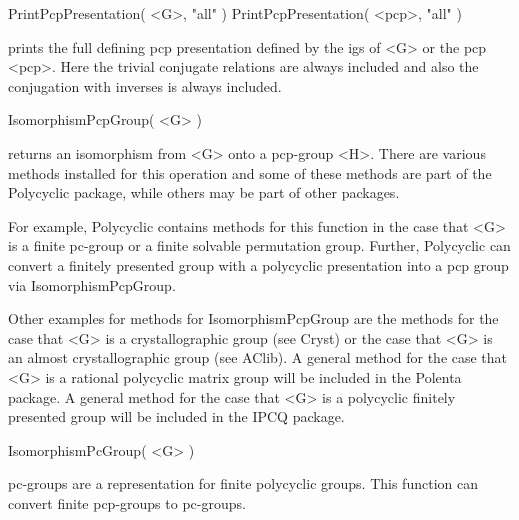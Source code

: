 \> PrintPcpPresentation( <G>, "all" )
\> PrintPcpPresentation( <pcp>, "all" )

prints the full defining pcp presentation defined by the igs of <G> or the 
pcp <pcp>. Here the trivial conjugate relations are always included and also
the conjugation with inverses is always included.


\>IsomorphismPcpGroup( <G> )

returns an isomorphism from <G> onto a pcp-group <H>. There are various
methods installed for this operation and some of these methods are part
of the Polycyclic package, while others may be part of other packages. 

For example, Polycyclic contains methods for this function in the case
that <G> is a finite pc-group or a finite solvable permutation group. 
Further, Polycyclic can convert a finitely presented group with a 
polycyclic presentation into a pcp group via IsomorphismPcpGroup.

Other examples for methods for IsomorphismPcpGroup are the methods for
the case that <G> is a crystallographic group (see Cryst) or the case
that <G> is an almost crystallographic group (see AClib). A general 
method for the case that <G> is a rational polycyclic matrix group will
be included in the Polenta package. A general method for the case that
<G> is a polycyclic finitely presented group will be included in the
IPCQ package. 

\>IsomorphismPcGroup( <G> )

pc-groups are a representation for finite polycyclic groups. This function
can convert finite pcp-groups to pc-groups.

